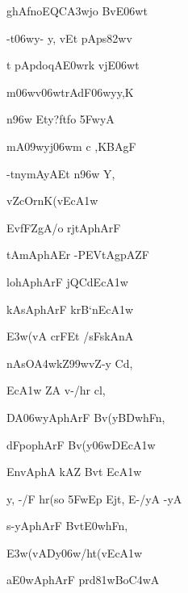 \dnnemslokad 
{\dn ghA\0fnoEQC\3A3wjo BvE\306wt \vegdn\dontdisplaylinenum}


\ujvers\dnnemsloka 
{\dn -t\4\306wy- y\4, v\0Et pAps\382wv}
\dontdisplaylinenum

\dnnemslokab 
{\dn t\? pApdoqA\3E0wrk\2 v\5jE\306wt \dandadn\dontdisplaylinenum}

\dnnemslokac 
{\dn m\306wv\306wtrAdF\306wyy,K}
\dontdisplaylinenum

\dnnemslokad 
{\dn {}n\396w Ety\0?ftfo \35FwyA \vegdn\dontdisplaylinenum}


\ujvers\dnnemsloka 
{\dn mA\309wyj\306wm\? c ,KBAgF}
\dontdisplaylinenum

\dnnemslokab 
{\dn -t\?n\?ymAyAEt n\396w Y, \dandadn\dontdisplaylinenum}

\dnnemslokac 
{\dn {}vZ\0cOrnK(vEc\3A1w}
\dontdisplaylinenum

\dnnemslokad 
{\dn EvfFZ\0gA/o rjtAphArF \vegdn\dontdisplaylinenum}


\ujvers\dnnemsloka 
{\dn tAm\5AphAEr -PEVtAg\5pAZF}
\dontdisplaylinenum

\dnnemslokab 
{\dn lohAphArF jQC\?dEc\3A1w\2 \dandadn\dontdisplaylinenum}

\dnnemslokac 
{\dn kA\2sAphArF krB`nEc\3A1w}
\dontdisplaylinenum

\dnnemslokad 
{\dn \3E3w(vA crFEt /sFskAnA \vegdn\dontdisplaylinenum}


\ujvers\dnnemsloka 
{\dn nAsO\3A4wkZ\0\399wvZ-y C\?d,}
\dontdisplaylinenum

\dnnemslokab 
{\dn Ec\3A1w\2 ZA\2 v-/hr\2 c\?l, \dandadn\dontdisplaylinenum}

\dnnemslokac 
{\dn DA\306wyAphArF Bv(y\?\3BDwhFn,}
\dontdisplaylinenum

\dnnemslokad 
{\dn dFpophArF Bv(y\306wDEc\3A1w \vegdn\dontdisplaylinenum}


\ujvers\dnnemsloka 
{\dn EnvA\0phA kAZ Bv\?t Ec\3A1w}
\dontdisplaylinenum

\dnnemslokab 
{\dn y, -/F hr\?(so \35FwEp Ejt, E-/yA -yA \dandadn\dontdisplaylinenum}

\dnnemslokac 
{\dn s-yAphArF Bvt\?\3E0whFn,}
\dontdisplaylinenum

\dnnemslokad 
{\dn \3E3w(vADy\306w/ht(vEc\3A1w\2 \vegdn\dontdisplaylinenum}


\ujvers\dnnemsloka 
{\dn a\3E0wAphArF prd\381wBo\3C4wA}
\dontdisplaylinenum


